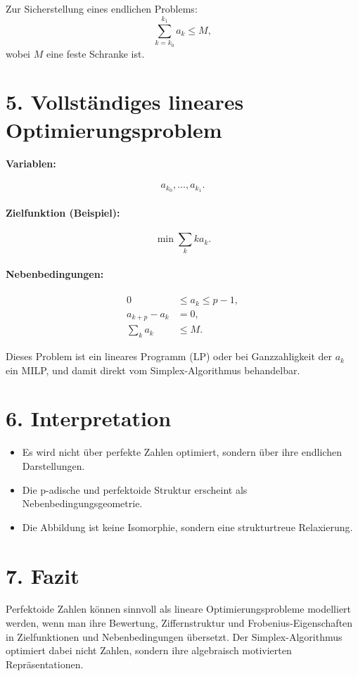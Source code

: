 \documentclass[11pt]{article}
\begin{document}
Zur Sicherstellung eines endlichen Problems:
\[
\sum_{k=k_0}^{k_1} a_k \le M,
\]
wobei \(M\) eine feste Schranke ist.

\section*{5. Vollständiges lineares Optimierungsproblem}

\paragraph{Variablen:}
\[
a_{k_0}, \dots, a_{k_1}.
\]

\paragraph{Zielfunktion (Beispiel):}
\[
\min \sum_k k a_k.
\]

\paragraph{Nebenbedingungen:}
\begin{align*}
0 &\le a_k \le p-1, \\
a_{k+p} - a_k &= 0, \\
\sum_k a_k &\le M.
\end{align*}

Dieses Problem ist ein lineares Programm (LP)
oder bei Ganzzahligkeit der \(a_k\) ein MILP,
und damit direkt vom Simplex-Algorithmus behandelbar.

\section*{6. Interpretation}

\begin{itemize}
\item Es wird nicht über perfekte Zahlen optimiert,
      sondern über ihre endlichen Darstellungen.
\item Die p-adische und perfektoide Struktur
      erscheint als Nebenbedingungsgeometrie.
\item Die Abbildung ist keine Isomorphie,
      sondern eine strukturtreue Relaxierung.
\end{itemize}

\section*{7. Fazit}

Perfektoide Zahlen können sinnvoll als
lineare Optimierungsprobleme modelliert werden,
wenn man ihre Bewertung, Ziffernstruktur und Frobenius-Eigenschaften
in Zielfunktionen und Nebenbedingungen übersetzt.
Der Simplex-Algorithmus optimiert dabei nicht Zahlen,
sondern ihre algebraisch motivierten Repräsentationen.
\end{document}
